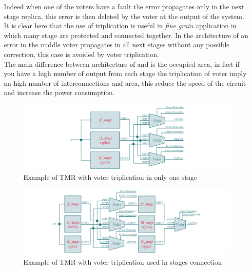 {{{{{        		    
        		    Indeed when one of the voters have a fault the error propagates only in the next stage replica, this error is then deleted by the voter at the output of the system. 
        		    It is clear here that the use of triplication is useful in \textit{fine grain} application in which many stage are protected and connected together.
        		    In the architecture of  an error in the middle voter propagates in all next stages without any possible correction, this case is avoided by voter triplication.\\
        		    
        		    The main difference between architecture of  and  is the occupied area, in fact if you have a high number of output from each stage the triplication of voter imply an high number of interconnections and area, this reduce the speed of the circuit and increase the power consumption.
        		    
        		    \begin{figure}[H]
            			\centering
            			\includegraphics[scale=0.2,center]{./images/TMR_tripleVoter.png}
            			\caption{Example of TMR with voter triplication in only one stage}
            			\label{fig:TMR2}
            		\end{figure}
            		
            		\begin{figure}[H]
            			\centering
            			\includegraphics[scale=0.2,center]{./images/TMR_tripleVoter2.png}
            			\caption{Example of TMR with voter triplication used in stages connection}
            			\label{fig:TMR3}
            		\end{figure} 
            		
}}}}}
